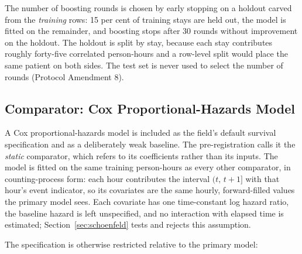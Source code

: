 The number of boosting rounds is chosen by early stopping on a holdout carved
from the \emph{training} rows: 15 per cent of training stays are held out, the
model is fitted on the remainder, and boosting stops after 30 rounds without
improvement on the holdout. The holdout is split by stay, because each stay
contributes roughly forty-five correlated person-hours and a row-level split
would place the same patient on both sides. The test set is never
used to select the number of rounds (Protocol Amendment 8).

\subsection{Comparator: Cox Proportional-Hazards Model}
\label{sec:cox_spec}

A Cox proportional-hazards model is included as the field's default survival
specification and as a deliberately weak baseline. The pre-registration calls
it the \emph{static} comparator, which refers to its coefficients rather than
its inputs. The model is fitted on the same training person-hours as every
other comparator, in counting-process form: each hour contributes the interval
$(t,\, t+1]$ with that hour's event indicator, so its covariates are the same
hourly, forward-filled values the primary model sees. Each covariate has one
time-constant log hazard ratio, the baseline hazard is left unspecified, and no
interaction with elapsed time is estimated; Section~\ref{sec:schoenfeld} tests
and rejects this assumption.

The specification is otherwise restricted relative to the primary model:


